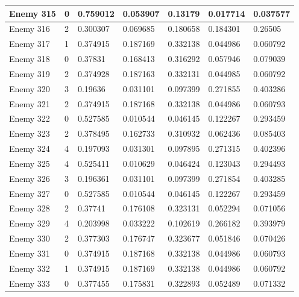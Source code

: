 \begin{longtable}{|l|l|l|l|l|l|l|}
	Enemy 315 & 0 & {\color[HTML]{009901} 0.759012} & 0.053907 & 0.13179 & 0.017714 & 0.037577 \\ \hline
	Enemy 316 & 2 & 0.300307 & 0.069685 & {\color[HTML]{FE0000} 0.180658} & 0.184301 & 0.26505 \\ \hline
	Enemy 317 & 1 & 0.374915 & {\color[HTML]{FE0000} 0.187169} & 0.332138 & 0.044986 & 0.060792 \\ \hline
	Enemy 318 & 0 & {\color[HTML]{009901} 0.37831} & 0.168413 & 0.316292 & 0.057946 & 0.079039 \\ \hline
	Enemy 319 & 2 & 0.374928 & 0.187163 & {\color[HTML]{FE0000} 0.332131} & 0.044985 & 0.060792 \\ \hline
	Enemy 320 & 3 & 0.19636 & 0.031101 & 0.097399 & {\color[HTML]{FE0000} 0.271855} & 0.403286 \\ \hline
	Enemy 321 & 2 & 0.374915 & 0.187168 & {\color[HTML]{FE0000} 0.332138} & 0.044986 & 0.060793 \\ \hline
	Enemy 322 & 0 & {\color[HTML]{009901} 0.527585} & 0.010544 & 0.046145 & 0.122267 & 0.293459 \\ \hline
	Enemy 323 & 2 & 0.378495 & 0.162733 & {\color[HTML]{FE0000} 0.310932} & 0.062436 & 0.085403 \\ \hline
	Enemy 324 & 4 & 0.197093 & 0.031301 & 0.097895 & 0.271315 & {\color[HTML]{009901} 0.402396} \\ \hline
	Enemy 325 & 4 & 0.525411 & 0.010629 & 0.046424 & 0.123043 & {\color[HTML]{FE0000} 0.294493} \\ \hline
	Enemy 326 & 3 & 0.196361 & 0.031101 & 0.097399 & {\color[HTML]{FE0000} 0.271854} & 0.403285 \\ \hline
	Enemy 327 & 0 & {\color[HTML]{009901} 0.527585} & 0.010544 & 0.046145 & 0.122267 & 0.293459 \\ \hline
	Enemy 328 & 2 & 0.37741 & 0.176108 & {\color[HTML]{FE0000} 0.323131} & 0.052294 & 0.071056 \\ \hline
	Enemy 329 & 4 & 0.203998 & 0.033222 & 0.102619 & 0.266182 & {\color[HTML]{009901} 0.393979} \\ \hline
	Enemy 330 & 2 & 0.377303 & 0.176747 & {\color[HTML]{FE0000} 0.323677} & 0.051846 & 0.070426 \\ \hline
	Enemy 331 & 0 & {\color[HTML]{009901} 0.374915} & 0.187168 & 0.332138 & 0.044986 & 0.060793 \\ \hline
	Enemy 332 & 1 & 0.374915 & 0.187169 & 0.332138 & 0.044986 & 0.060792 \\ \hline
	Enemy 333 & 0 & {\color[HTML]{009901} 0.377455} & 0.175831 & 0.322893 & 0.052489 & 0.071332 \\ \hline

\end{longtable}
